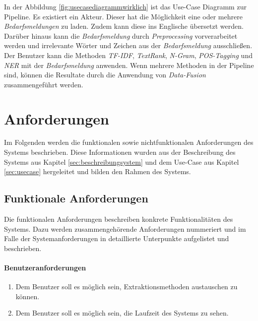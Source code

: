 In der Abbildung \ref{fig:usecasediagrammwirklich} ist das Use-Case Diagramm zur Pipeline. Es existiert ein Akteur. Dieser hat die Möglichkeit eine oder mehrere \emph{Bedarfsmeldungen} zu laden. Zudem kann diese ins Englische übersetzt werden. Darüber hinaus kann die \emph{Bedarfsmeldung} durch \emph{Preprocessing} vorverarbeitet werden und irrelevante Wörter und Zeichen aus der \emph{Bedarfsmeldung} ausschließen. Der Benutzer kann die Methoden \emph{TF-IDF}, \emph{TextRank}, \emph{N-Gram}, \emph{POS-Tagging} und \emph{NER} mit der \emph{Bedarfsmeldung} anwenden. Wenn mehrere Methoden in der Pipeline sind, können die Resultate durch die Anwendung von \emph{Data-Fusion} zusammengeführt werden.
\section{Anforderungen}
Im Folgenden werden die funktionalen sowie nichtfunktionalen Anforderungen des Systems beschrieben. Diese Informationen wurden aus der Beschreibung des Systems aus Kapitel \ref{sec:beschreibungsystem} und dem Use-Case aus Kapitel \ref{sec:usecase} hergeleitet und bilden den Rahmen des Systems.
\subsection{Funktionale Anforderungen}
Die funktionalen Anforderungen beschreiben konkrete Funktionalitäten des Systems. Dazu werden zusammengehörende Anforderungen nummeriert und im Falle der Systemanforderungen in detaillierte Unterpunkte aufgelistet und beschrieben.
\paragraph{Benutzeranforderungen}
\begin{enumerate}
	\item Dem Benutzer soll es möglich sein, Extraktionsmethoden austauschen zu können.
	\item Dem Benutzer soll es möglich sein, die Laufzeit des Systems zu sehen.
\end{enumerate}
